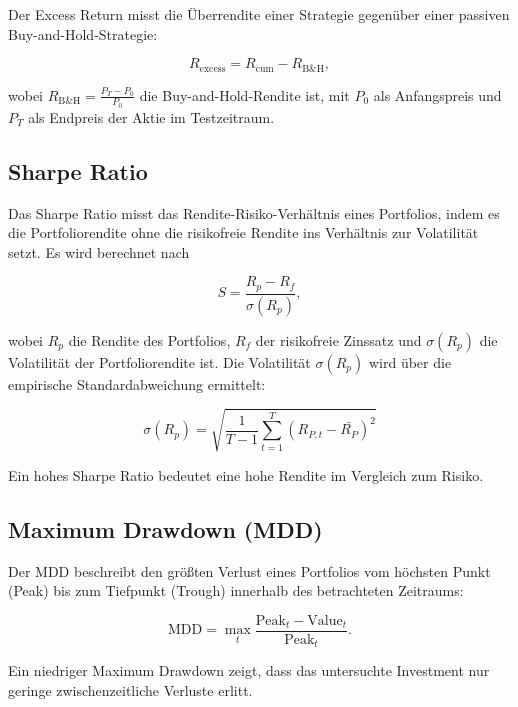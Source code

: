 Der Excess Return misst die Überrendite einer Strategie gegenüber einer passiven Buy-and-Hold-Strategie:

\[
    R_{\mathrm{excess}} = R_{\mathrm{cum}} - R_{\mathrm{B\&H}},
\]

wobei $R_{\mathrm{B\&H}} = \frac{P_T - P_0}{P_0}$ die Buy-and-Hold-Rendite ist, mit $P_0$ als Anfangspreis und $P_T$ als Endpreis der Aktie im Testzeitraum.

\subsection*{Sharpe Ratio}

Das Sharpe Ratio misst das Rendite-Risiko-Verhältnis eines Portfolios, indem es die Portfoliorendite ohne die risikofreie Rendite ins Verhältnis zur Volatilität setzt. Es wird berechnet nach

\[
    S = \frac{R_p - R_f}{\sigma(R_p)},
\]

wobei \(R_p\) die Rendite des Portfolios, \(R_f\) der risikofreie Zinssatz und \(\sigma(R_p)\) die Volatilität der Portfoliorendite ist. Die Volatilität $\sigma(R_p)$ wird über die empirische Standardabweichung ermittelt:

\[
    \sigma(R_p) = \sqrt{ \frac{1}{T - 1} \sum_{t=1}^{T}{( R_{P,t} - \bar{R_P})}^2}
\]

Ein hohes Sharpe Ratio bedeutet eine hohe Rendite im Vergleich zum Risiko.

\subsection*{Maximum Drawdown (MDD)}

Der \ac{MDD} beschreibt den größten Verlust eines Portfolios vom höchsten Punkt (Peak) bis zum Tiefpunkt (Trough) innerhalb des betrachteten Zeitraums:

\[
    \text{MDD} = \max_{t} \frac{\text{Peak}_t - \text{Value}_t}{\text{Peak}_t}.
\]

Ein niedriger Maximum Drawdown zeigt, dass das untersuchte Investment nur geringe zwischenzeitliche Verluste erlitt.
